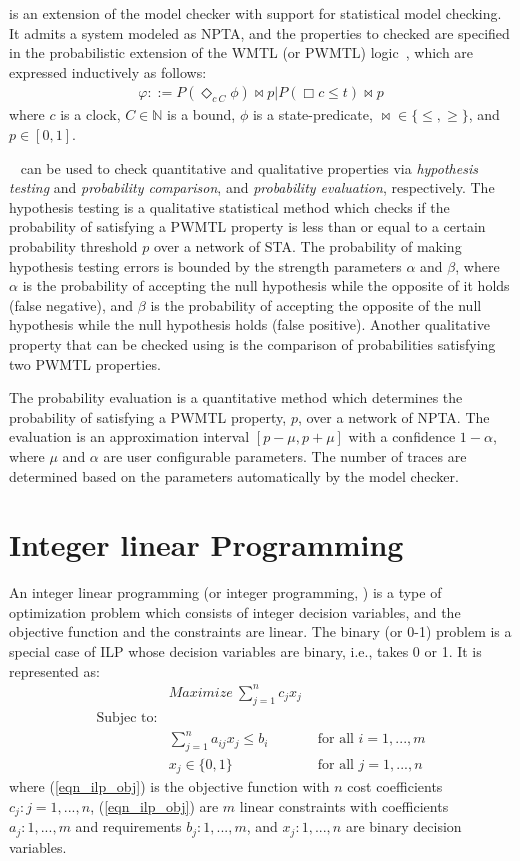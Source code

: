 \uppaalsmc{} is an extension of the model checker \uppaal with support for statistical model checking. It admits a system modeled as NPTA, and the properties to checked are specified in the probabilistic extension of the WMTL (or PWMTL) logic~\cite{Bulychev2012UPPAAL-SMC:Automata}, which are expressed inductively as follows:
\begin{align}
\varphi::=P(\Diamond_{c\ C}\phi)\bowtie p | P(\Box c\leq t)\bowtie p
\end{align}
where $c$ is a clock, $C\in \mathbb{N}$ is a bound, $\phi$ is a state-predicate, $\bowtie \in\{\leq,\geq\}$, and $p \in [0, 1]$.

\uppaalsmc~\cite{David2011TimeSystems}\cite{Bulychev2012UPPAAL-SMC:Automata} can be used to check quantitative and qualitative properties via \textit{hypothesis testing} and \textit{probability comparison}, and \textit{probability evaluation}, respectively. The
hypothesis testing is a qualitative statistical method which checks if the probability of satisfying a PWMTL property is less than or equal to a certain probability threshold $p$ over a network of STA. The probability of making hypothesis testing errors is bounded by the strength parameters $\alpha$ and $\beta$, where $\alpha$ is the probability of accepting the null hypothesis while the opposite of it holds (false negative), and $\beta$ is the probability of accepting the opposite of the null hypothesis while the null hypothesis holds (false positive). Another qualitative property that can be checked using \uppaalsmc{} is the comparison of probabilities satisfying two PWMTL properties.

The probability evaluation is a quantitative method which determines the probability of satisfying a PWMTL property, $p$, over a network of NPTA. The evaluation is an approximation interval $[p-\mu,p+\mu]$ with a confidence $1-\alpha$, where $\mu$ and $\alpha$ are user configurable parameters. The number of traces are determined based on the parameters automatically by the model checker.
\vspace{2cm}
\section{Integer linear Programming}
An integer linear programming (or integer programming, \ilp) is a type of optimization problem which consists of integer decision variables, and the objective function and the constraints are linear. The binary (or 0-1) \ilp{} problem is a special case of ILP whose decision variables are binary, i.e., takes 0 or 1. It is represented as:
\begin{align}
    \label{eqn_ilp_obj}
	&Maximize\ \sum_{j=1}^{n}{c_jx_j}\\\nonumber
	\mbox{Subjec to:}&\\\nonumber
	&\sum_{j=1}^n{a_{ij}x_j}\leq b_i&\mbox{ for all } i=1,...,m\\
	&x_j\in\{0,1\} &\mbox{ for all } j=1,...,n
\end{align}
where (\ref{eqn_ilp_obj}) is the objective function with $n$ cost coefficients $c_j:j=1,...,n$, (\ref{eqn_ilp_obj}) are $m$ linear constraints with coefficients $a_j:1,...,m$ and requirements $b_j:1,...,m$, and $x_j:1,...,n$ are binary decision variables.


